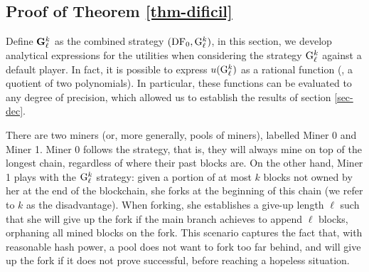 
\subsection{Proof of Theorem \ref{thm-dificil}}
\label{sec-evaluation-G}
Define ${\rm {\bf G}}_\ell^k$ as the combined strategy $(\text{\rm DF}_0, {\rm {G}}_\ell^k)$, in this section, we develop analytical expressions for the utilities when
considering the strategy ${\rm {G}}^k_\ell$ against a default player. In fact, it is
possible to express $u({\rm {G}}^k_\ell)$ as a rational function (\ie, a quotient of
two polynomials). In particular, these functions can be evaluated to any degree
of precision, which allowed us to establish the results of section
\ref{sec-dec}.


There are two miners (or, more generally, pools of miners), labelled Miner 0
and Miner 1. Miner 0 follows the \cdf{} strategy, that is, they will always
mine on top of the longest chain, regardless of where their past blocks are. On
the other hand, Miner 1 plays with the ${\rm {G}}^k_\ell$ strategy: given a portion
of at most $k$ blocks not owned by her at the end of the blockchain, she forks
at the beginning of this chain (we refer to $k$ as the disadvantage). When
forking, she establishes a give-up length $\ell$ such that she will give up the
fork if the main branch achieves to append $\ell$ blocks, orphaning all mined
blocks on the fork. This scenario captures the fact that, with reasonable hash
power, a pool does not want to fork too far behind, and will give up the fork
if it does not prove successful, before reaching a hopeless situation.




